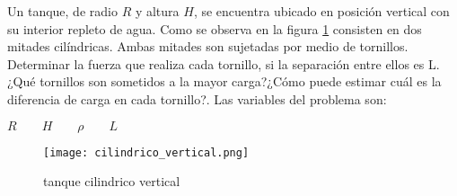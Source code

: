 \item Un tanque, de radio $R$ y altura $H$, se encuentra ubicado en posición vertical con su interior repleto de agua. Como se observa en la figura \ref{fig:tanque_vert} consisten en dos mitades cilíndricas. Ambas mitades son sujetadas por medio de tornillos. Determinar la fuerza que realiza cada tornillo, si la separación entre ellos es L. ¿Qué tornillos son sometidos a la mayor carga?¿Cómo puede estimar cuál es la diferencia de carga en cada tornillo?. Las variables del problema son:
\begin{center}
$R \qquad H \qquad \rho \qquad L$
\end{center}

\begin{figure}[h!!!!]
\centering
\texttt{[image: cilindrico\_vertical.png]}
\caption{tanque cilindrico vertical}
\label{fig:tanque_vert}
\end{figure}
